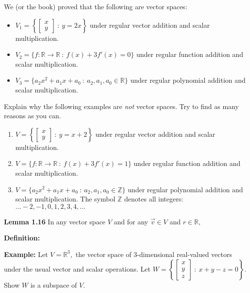 \documentclass[11pt,fleqn]{article}
\begin{document}
\renewcommand{\headrulewidth}{0pt}
\newcommand{\blank}[1]{\rule{#1}{0.75pt}}
\renewcommand{\d}{\displaystyle}

\vspace*{-0.7in}
\begin{center}
  \large {}
\end{center}

We (or the book) proved that the following are vector spaces:
\begin{itemize}
	\item $V_1=\left\{\begin{bmatrix} x \\ y \end{bmatrix} \: : \: y=2x\right\}$ under regular vector addition and scalar multiplication.
\item  $V_2=\{f: \mathbb{R} \to \mathbb{R} \: : \: f(x)+3f'(x)=0\}$ under regular function addition and scalar multiplication.
\item $V_3=\{a_2x^2+a_1x+a_0 \: : \: a_2,a_1,a_0 \in \mathbb{R}\}$ under regular polynomial addition and scalar multiplication.
\end{itemize}

Explain why the following examples are \emph{not} vector spaces. Try to find as many reasons as you can.
\begin{enumerate}
	\item $V=\left\{\begin{bmatrix} x \\ y \end{bmatrix} \: : \: y=x+2\right\}$ under regular vector addition and scalar multiplication.
	\vfill
\item  $V=\{f: \mathbb{R} \to \mathbb{R} \: : \: f(x)+3f'(x)=1\}$ under regular function addition and scalar multiplication.
\vfill
\item $V=\{a_2x^2+a_1x+a_0 \: : \: a_2,a_1,a_0 \in \mathbb{Z}\}$ under regular polynomial addition and scalar multiplication. The symbol $\mathbb{Z}$ denotes all integers: $...-2,-1,0,1,2,3,4,...$
\vfill
\end{enumerate}
\newpage
\noindent\textbf{Lemma 1.16} In any vector space $V$ and for any $\vec{v} \in V$ and $r \in \mathbb{R},$\\
\vspace{1.5in}

\begin{center}
  \large {}
\end{center}

\noindent\textbf{Definition:}\\

\vspace{0.5in}

\noindent\textbf{Example: } Let $V=\mathbb{R}^3,$ the vector space of 3-dimensional real-valued vectors under the usual vector and scalar operations. Let $W=\left\{\begin{bmatrix} x \\ y \\ z \end{bmatrix} \: : \: x+y-z=0\right\}.$ Show $W$ is a subspace of $V.$
\end{document}
